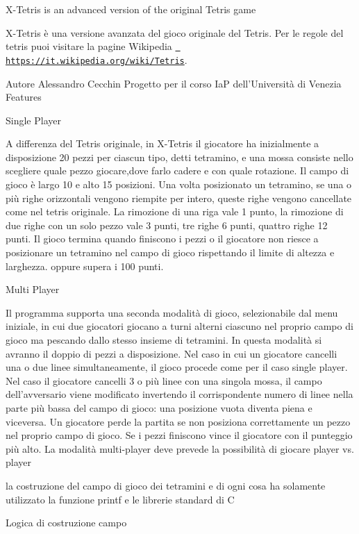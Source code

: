 X-\/\+Tetris is an advanced version of the original Tetris game

X-\/\+Tetris è una versione avanzata del gioco originale del Tetris. Per le regole del tetris puoi visitare la pagine Wikipedia \href{https://it.wikipedia.org/wiki/Tetris}{\texttt{ https\+://it.\+wikipedia.\+org/wiki/\+Tetris}}.

Autore Alessandro Cecchin Progetto per il corso IaP dell’\+Università di Venezia Features

Single Player

A differenza del Tetris originale, in X-\/\+Tetris il giocatore ha inizialmente a disposizione 20 pezzi per ciascun tipo, detti tetramino, e una mossa consiste nello scegliere quale pezzo giocare,dove farlo cadere e con quale rotazione. Il campo di gioco è largo 10 e alto 15 posizioni. Una volta posizionato un tetramino, se una o più righe orizzontali vengono riempite per intero, queste righe vengono cancellate come nel tetris originale. La rimozione di una riga vale 1 punto, la rimozione di due righe con un solo pezzo vale 3 punti, tre righe 6 punti, quattro righe 12 punti. Il gioco termina quando finiscono i pezzi o il giocatore non riesce a posizionare un tetramino nel campo di gioco rispettando il limite di altezza e larghezza. oppure supera i 100 punti.

Multi Player

Il programma supporta una seconda modalità di gioco, selezionabile dal menu iniziale, in cui due giocatori giocano a turni alterni ciascuno nel proprio campo di gioco ma pescando dallo stesso insieme di tetramini. In questa modalità si avranno il doppio di pezzi a disposizione. Nel caso in cui un giocatore cancelli una o due linee simultaneamente, il gioco procede come per il caso single player. Nel caso il giocatore cancelli 3 o più linee con una singola mossa, il campo dell’avversario viene modificato invertendo il corrispondente numero di linee nella parte più bassa del campo di gioco\+: una posizione vuota diventa piena e viceversa. Un giocatore perde la partita se non posiziona correttamente un pezzo nel proprio campo di gioco. Se i pezzi finiscono vince il giocatore con il punteggio più alto. La modalità multi-\/player deve prevede la possibilità di giocare player vs. player

la costruzione del campo di gioco dei tetramini e di ogni cosa ha solamente utilizzato la funzione printf e le librerie standard di C

Logica di costruzione campo

